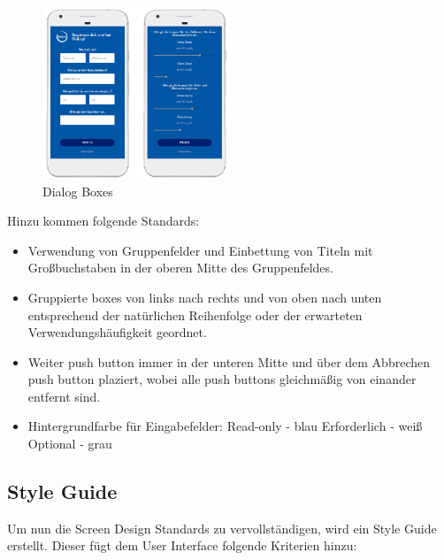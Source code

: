 \begin{figure}[H]
	\centering
	\includegraphics[width=0.5\textwidth]{images/DialogBox.png}
	\captionsetup{justification=centering}
	\caption{Dialog Boxes}
	\label{img:dialogbox}
\end{figure}
Hinzu kommen folgende Standards:
\begin{itemize}
	\item Verwendung von Gruppenfelder und Einbettung von Titeln mit Großbuchstaben in der oberen Mitte des Gruppenfeldes.
	\item Gruppierte boxes von links nach rechts und von oben nach unten entsprechend der natürlichen Reihenfolge oder der erwarteten Verwendungshäufigkeit geordnet.
	\item Weiter push button immer in der unteren Mitte und über dem Abbrechen push button plaziert, wobei alle push buttons gleichmäßig von einander entfernt sind.
	\item Hintergrundfarbe für Eingabefelder:\newline
		\noindent\hspace*{10mm}Read-only - blau \newline
		\noindent\hspace*{10mm}Erforderlich - weiß \newline
		\noindent\hspace*{10mm}Optional - grau 
\end{itemize}

\subsection{Style Guide}
Um nun die Screen Design Standards zu vervollständigen, wird ein Style Guide erstellt. Dieser fügt dem User Interface folgende Kriterien hinzu:\\

